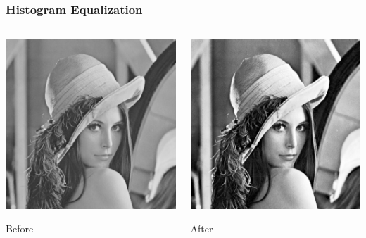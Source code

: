 \begin{frame}
    \frametitle{Histogram Equalization}
    \begin{columns}[T, onlytextwidth]
        \begin{column}{0.5\textwidth}\centering
            \includegraphics[height=0.7\textheight]{img/lena_bw}

            Before
        \end{column}
        \begin{column}{0.5\textwidth}\centering
            \includegraphics[height=0.7\textheight]{img/lena_histeq}

            After
        \end{column}
    \end{columns}
\end{frame}


